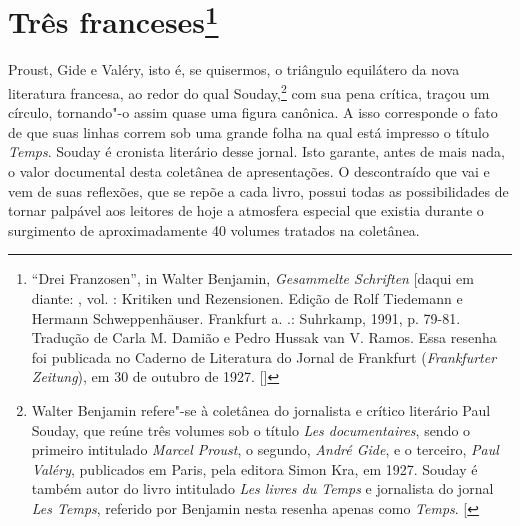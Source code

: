 \chapter{Três franceses\footnote[*]{``Drei Franzosen'',
  in Walter Benjamin, \emph{Gesammelte Schriften} {[}daqui em diante:
  \versal{GS}{]}, vol. : Kritiken und Rezensionen. Edição de Rolf Tiedemann e
  Hermann Schweppenhäuser. Frankfurt a. .: Suhrkamp, 1991, p. 79-81.
  Tradução de Carla M. Damião e Pedro Hussak van V. Ramos. Essa resenha
  foi publicada no Caderno de Literatura do Jornal de Frankfurt
  (\emph{Frankfurter Zeitung}), em 30 de outubro de 1927.
  []}}

Proust, Gide e Valéry, isto é, se quisermos, o triângulo equilátero da
nova literatura francesa, ao redor do qual Souday,\footnote{Walter
  Benjamin refere"-se à coletânea do jornalista e crítico literário Paul
  Souday, que reúne três volumes sob o título \emph{Les documentaires},
  sendo o primeiro intitulado \emph{Marcel Proust}, o segundo,
  \emph{André Gide}, e o terceiro, \emph{Paul Valéry}, publicados em
  Paris, pela editora Simon Kra, em 1927. Souday é também autor do livro
  intitulado \emph{Les livres du Temps} e jornalista do jornal \emph{Les
  Temps}, referido por Benjamin nesta resenha apenas como \emph{Temps}.
  {[}\versal{N.~E.}{]}} com sua pena crítica, traçou um círculo, tornando"-o assim
quase uma figura canônica. A isso corresponde o fato de que suas linhas
correm sob uma grande folha na qual está impresso o título \emph{Temps}.
Souday é cronista literário desse jornal. Isto garante, antes de mais
nada, o valor documental desta coletânea de apresentações. O
descontraído que vai e vem de suas reflexões, que se repõe a cada livro,
possui todas as possibilidades de tornar palpável aos leitores de hoje a
atmosfera especial que existia durante o surgimento de aproximadamente
40 volumes tratados na coletânea.

